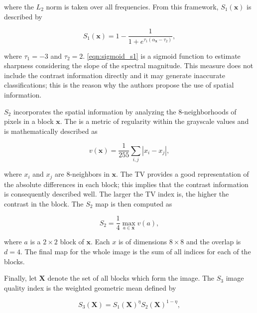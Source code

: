 \noindent where the $L_{2}$ norm is taken over all frequencies. From this framework, $S_{1}(\mathbf{x})$ is described by

\begin{equation}
\label{eqn:sigmoid_s1}
S_{1}(\mathbf{x}) = 1 - \frac{1}{1 + e^{\tau_{1}
(\alpha_{\mathbf{x}} - \tau_{2})}},
\end{equation}

\noindent where $\tau_{1} = -3$ and $\tau_{2} = 2$. \autoref{eqn:sigmoid_s1} is a sigmoid function to estimate sharpness considering the slope of the spectral magnitude. This measure does not include the contrast information directly and it may generate inaccurate classifications; this is the reason why the authors propose the use of spatial information.

$S_{2}$ incorporates the spatial information by analyzing the 8-neighborhoods of pixels in a block $\mathbf{x}$. The  is a metric of regularity within the grayscale values and is mathematically described as

\begin{equation}
\label{eqn:total_variation}
v(\mathbf{x}) = \frac{1}{255}\sum_{i,j}\left|x_{i} - x_{j}\right|,
\end{equation}

\noindent where $x_{i}$ and $x_{j}$ are 8-neighbors in $\mathbf{x}$. The TV provides a good representation of the absolute differences in each block; this implies that the contrast information is consequently described well. The larger the TV index is, the higher the contrast in the block. The $S_{2}$ map is then computed as

\begin{equation}
\label{eqn:spatial_s2}
S_{2} = \frac{1}{4} \max_{a \in \mathbf{x}} v(a),
\end{equation}

\noindent where $a$ is a $2 \times 2$ block of $\mathbf{x}$. Each $x$ is of dimensions $8 \times 8$ and the overlap is $d = 4$. The final map for the whole image is the sum of all indices for each of the blocks.

Finally, let $\mathbf{X}$ denote the set of all blocks which form the image. The $S_{3}$ image quality index is the weighted geometric mean defined by

\begin{equation}
\label{eqn:s3_index}
S_{3}(\mathbf{X}) = S_{1}(\mathbf{X})^{\eta} S_{2}(\mathbf{X})^{1 - \eta},
\end{equation}

